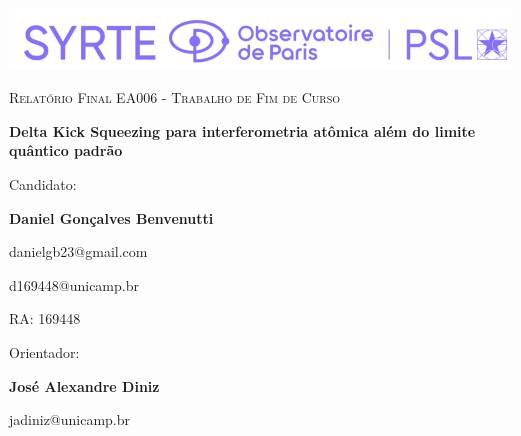 
\begin{center}

\thispagestyle{unicamp}

\baselineskip

    \includegraphics[width=0.7\linewidth]{logo-syrte.png}
    
\null\vfill

{\scshape\large Relatório Final EA006 - Trabalho de Fim de Curso \par}

\baselineskip

{\LARGE\bfseries Delta Kick Squeezing para interferometria atômica além do limite quântico padrão\par}

\baselineskip

Candidato:\\[1ex]
{\large\bfseries Daniel Gonçalves Benvenutti\par}
{\large danielgb23@gmail.com\par}
{\large d169448@unicamp.br\par}
{\large RA: 169448\par}

\baselineskip

Orientador:\\[1ex]
{\large\bfseries José Alexandre Diniz\par}
{\large jadiniz@unicamp.br\par}

\end{center}

\vfill